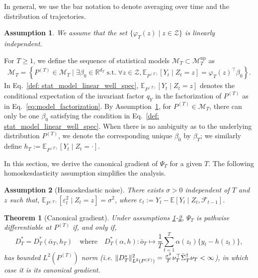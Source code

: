 \documentclass[10pt,a4paper]{amsart}
\newtheorem{assum}{Assumption}
\newtheorem{thm}{Theorem}
\begin{document}
In general, we use the bar notation to denote averaging over time and the distribution of trajectories. 
\begin{assum}
\label{eq: characteristic_feature}
We assume that the set $\{\varphi_T(z) \mid z \in \mathcal{Z}\}$ is linearly independent. 
\end{assum}
For $T\geq 1$, we define the sequence of statistical models $\mathcal{M}_T\subset \mathcal{M}_T^{\mathrm{np}}$ as 
\begin{align}
\label{def: stat_model_linear_well_spec}
    \mathcal{M}_T = \left\{P^{(T)} \in \mathcal{M}_T \mid \exists \beta_0 \in \mathbb R^{d_T} \;\text{s.t.}\;\forall z\in \mathcal{Z}, 
    \mathbb{E}_{P^{(T)}}[Y_t \mid Z_t = z] = \varphi_T(z)^{\top}\beta_0\right\}. 
\end{align}
In Eq.~\eqref{def: stat_model_linear_well_spec}, $\mathbb{E}_{P^{(T)}}[Y_t \mid Z_t = z]$ denotes the conditional expectation of the invariant factor $q_Y$ in the factorization of $P^{(T)}$ as in Eq.~\eqref{eq:model_factorization}. By Assumption~\ref{eq: characteristic_feature}, for $P^{(T)}\in \mathcal{M}_T$, there can only be one $\beta_0$ satisfying the condition in Eq.~\eqref{def: stat_model_linear_well_spec}. When there is no ambiguity as to the underlying distribution $P^{(T)}$, we denote the corresponding unique $\beta_0$ by $\beta_T$; we similarly define $h_T := \mathbb{E}_{P^{(T)}}[Y_t\mid Z_t = \cdot]$. 

In this section, we derive the canonical gradient of $\Psi_T$ for a given $T$. The following homoskesdasticity assumption simplifies the analysis.
\begin{assum}[Homoskedastic noise]
\label{ass: homoschedastic}
There exists $\sigma > 0$ independent of $T$ and $z$ such that, $\mathbb{E}_{P^{(T)}}[\varepsilon_t^2 \mid Z_t = z] = \sigma^2$, where $\varepsilon_t := Y_t - \mathbb{E}[Y_t\mid Z_t, \mathcal{F}_{t-1}]$.
\end{assum}
\begin{thm}[Canonical gradient]
\label{thm: sp_can_grad}
Under assumptions \ref{eq: characteristic_feature}-\ref{ass: homoschedastic}, $\Psi_T$ is pathwise differentiable at $P^{(T)}$ if, and only if, 
\begin{equation}
\label{eq:canonical_gradient}
D^{\ast}_T = D^*_T(\bar \alpha_T, h_T) \quad \text{where} \quad D_T^*(\alpha, h): \bar{o}_T  \mapsto \frac{1}{T}\sum_{t=1}^T
\alpha(z_t)\bigl\{y_t-h(z_t)\bigr\},
\end{equation}
has bounded $L^2(P^{(T)})$ norm (i.e. $\|D^{\ast}_T\|^2_{L^{2}(P^{(T)})} = \frac{\sigma^2}{T}\nu_T^{\top}\Bar{\Sigma}_T^{\dag}\nu_T < \infty$), in which case it is its canonical gradient.
\end{thm}
\end{document}
